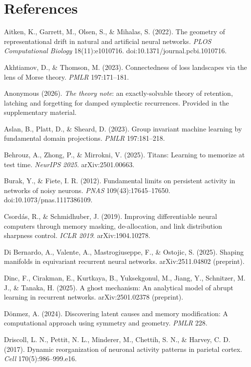 \documentclass{article}
\begin{document}
\section*{References}
{\footnotesize
\begingroup
\setlength{\parindent}{-0.22in}\setlength{\leftskip}{0.22in}\setlength{\parskip}{2pt}

Aitken, K., Garrett, M., Olsen, S., \& Mihalas, S. (2022). The geometry of representational drift in natural and artificial neural networks. \emph{PLOS Computational Biology} 18(11):e1010716. doi:10.1371/journal.pcbi.1010716.\par
Akhtiamov, D., \& Thomson, M. (2023). Connectedness of loss landscapes via the lens of Morse theory. \emph{PMLR} 197:171--181.\par
Anonymous (2026). \emph{The theory note}: an exactly-solvable theory of retention, latching and forgetting for damped symplectic recurrences. Provided in the supplementary material.\par
Aslan, B., Platt, D., \& Sheard, D. (2023). Group invariant machine learning by fundamental domain projections. \emph{PMLR} 197:181--218.\par
Behrouz, A., Zhong, P., \& Mirrokni, V. (2025). Titans: Learning to memorize at test time. \emph{NeurIPS 2025}. arXiv:2501.00663.\par
Burak, Y., \& Fiete, I. R. (2012). Fundamental limits on persistent activity in networks of noisy neurons. \emph{PNAS} 109(43):17645--17650. doi:10.1073/pnas.1117386109.\par
Csord\'as, R., \& Schmidhuber, J. (2019). Improving differentiable neural computers through memory masking, de-allocation, and link distribution sharpness control. \emph{ICLR 2019}. arXiv:1904.10278.\par
Di Bernardo, A., Valente, A., Mastrogiuseppe, F., \& Ostojic, S. (2025). Shaping manifolds in equivariant recurrent neural networks. arXiv:2511.04802 (preprint).\par
Dinc, F., Cirakman, E., Kurtkaya, B., Yuksekgonul, M., Jiang, Y., Schnitzer, M. J., \& Tanaka, H. (2025). A ghost mechanism: An analytical model of abrupt learning in recurrent networks. arXiv:2501.02378 (preprint).\par
D\"onmez, A. (2024). Discovering latent causes and memory modification: A computational approach using symmetry and geometry. \emph{PMLR} 228.\par
Driscoll, L. N., Pettit, N. L., Minderer, M., Chettih, S. N., \& Harvey, C. D. (2017). Dynamic reorganization of neuronal activity patterns in parietal cortex. \emph{Cell} 170(5):986--999.e16.\par
}
\end{document}
